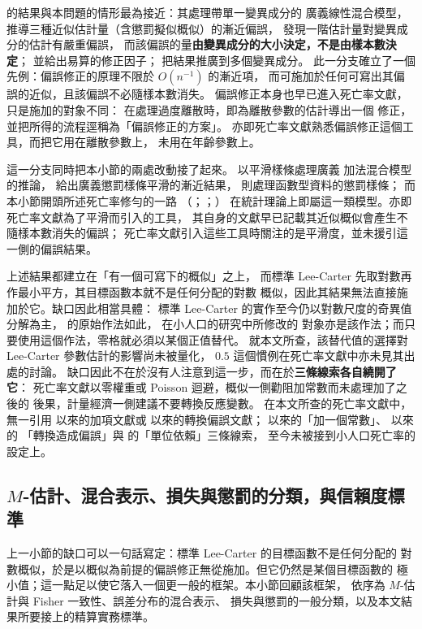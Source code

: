 \documentclass[UTF8, fontset=macnew, a4paper, 12pt]{ctexart}
\begin{document}
\citet{breslow1995} 的結果與本問題的情形最為接近：其處理帶單一變異成分的
廣義線性混合模型，推導三種近似估計量（含懲罰擬似概似）的漸近偏誤，
發現一階估計量對變異成分的估計有嚴重偏誤，
而該偏誤的量\textbf{由變異成分的大小決定，不是由樣本數決定}；
並給出易算的修正因子；\citet{linbreslow1996} 把結果推廣到多個變異成分。
此一分支確立了一個先例：偏誤修正的原理不限於 $O(n^{-1})$ 的漸近項，
而可施加於任何可寫出其偏誤的近似，且該偏誤不必隨樣本數消失。
偏誤修正本身也早已進入死亡率文獻，只是施加的對象不同：
\citet[\S4]{djeundje2010} 在處理過度離散時，即為離散參數的估計導出一個
修正，並把所得的流程逕稱為「偏誤修正的方案」。
亦即死亡率文獻熟悉偏誤修正這個工具，而把它用在離散參數上，
未用在年齡參數上。

這一分支同時把本小節的兩處改動接了起來。\citet{lin1999} 以平滑樣條處理廣義
加法混合模型的推論，\citet{kauermann2009} 給出廣義懲罰樣條平滑的漸近結果，
\citet{xiao2020} 則處理函數型資料的懲罰樣條；
而本小節開頭所述死亡率修勻的一路
（\citealp{currie2004}；\citealp{delwarde2007}；\citealp{currie2013}）
在統計理論上即屬這一類模型。亦即死亡率文獻為了平滑而引入的工具，
其自身的文獻早已記載其近似概似會產生不隨樣本數消失的偏誤；
死亡率文獻引入這些工具時關注的是平滑度，並未援引這一側的偏誤結果。

上述結果都建立在「有一個可寫下的概似」之上，
而標準 Lee-Carter 先取對數再作最小平方，其目標函數本就不是任何分配的對數
概似，因此其結果無法直接施加於它。缺口因此相當具體：
標準 Lee-Carter 的實作至今仍以對數尺度的奇異值分解為主，
\citet{lee1992} 的原始作法如此，\citet{yue2019} 在小人口的研究中所修改的
對象亦是該作法；而只要使用這個作法，零格就必須以某個正值替代。
就本文所查，該替代值的選擇對 Lee-Carter 參數估計的影響尚未被量化，
$0.5$ 這個慣例在死亡率文獻中亦未見其出處的討論。
缺口因此不在於沒有人注意到這一步，而在於\textbf{三條線索各自繞開了它}：
死亡率文獻以零權重或 Poisson 迴避，概似一側勸阻加常數而未處理加了之後的
後果，計量經濟一側建議不要轉換反應變數。
在本文所查的死亡率文獻中，無一引用 \citet{haldane1956} 以來的加項文獻或
\citet{duan1983} 以來的轉換偏誤文獻；
\citet{haldane1956} 以來的「加一個常數」、\citet{duan1983} 以來的
「轉換造成偏誤」與 \citet{chenroth2024} 的「單位依賴」三條線索，
至今未被接到小人口死亡率的設定上。

\subsection{$M$-估計、混合表示、損失與懲罰的分類，與信賴度標準}\label{subsec:mest}\label{subsec:mix}\label{subsec:mq}\label{subsec:cred}

上一小節的缺口可以一句話寫定：標準 Lee-Carter 的目標函數不是任何分配的
對數概似，於是以概似為前提的偏誤修正無從施加。但它仍然是某個目標函數的
極小值；這一點足以使它落入一個更一般的框架。本小節回顧該框架，
依序為 $M$-估計與 Fisher 一致性、誤差分布的混合表示、
損失與懲罰的一般分類，以及本文結果所要接上的精算實務標準。
\end{document}
